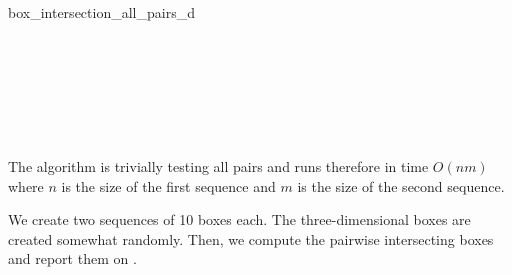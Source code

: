 \begin{ccRefFunction}{box_intersection_all_pairs_d}
\ccSeeAlso

\\

\\
\\

\begin{ccAdvanced}

\\

\end{ccAdvanced}


\ccImplementation

The algorithm is trivially testing all pairs and runs therefore in time
$O(nm)$ where $n$ is the size of the first sequence and $m$ is the
size of the second sequence.

\ccExample

We create two sequences of 10 boxes each. The three-dimensional boxes
are created somewhat randomly. Then, we compute the pairwise
intersecting boxes and report them on .


\end{ccRefFunction}



